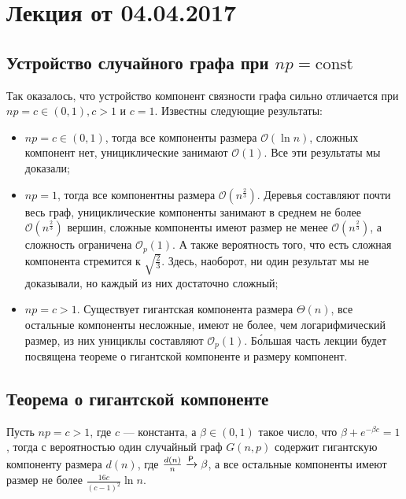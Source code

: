 \section{Лекция от 04.04.2017}

\subsection{Устройство случайного графа при $np = \mathrm{const}$}

Так оказалось, что устройство компонент связности
графа сильно отличается при 
$np = c \in (0, 1), c > 1$ и $c = 1$. Известны следующие результаты:

\begin{itemize}
  \item $np = c \in (0, 1)$, тогда все компоненты размера 
  $\mathcal{O}(\ln n)$, сложных компонент нет, 
  унициклические занимают $\mathcal{O}(1)$. Все эти результаты мы
  доказали;

  \item $np = 1$, тогда все компонентны размера $\mathcal{O}(n^{\frac23})$.
  Деревья составляют почти весь граф, унициклические компоненты занимают в 
  среднем не более $\mathcal{O}(n^{\frac23})$ вершин, сложные компоненты имеют
  размер не менее $\mathcal{O}(n^{\frac23})$, а сложность ограничена 
  $\mathcal{O}_p(1)$. А также вероятность того, что есть сложная компонента 
  стремится к $\sqrt{\frac23}$. Здесь, наоборот, ни один результат мы не 
  доказывали, но каждый из них достаточно сложный;

  \item $np = c > 1$. Существует гигантская компонента размера $\Theta(n)$, все
  остальные компоненты несложные, имеют не более, чем логарифмический размер, 
  из них унициклы составляют $\mathcal{O}_p(1)$.
  Б\'{о}льшая часть лекции будет посвящена теореме о гигантской компоненте и 
  размеру компонент.
\end{itemize}

\subsection{Теорема о гигантской компоненте}

\begin{theorem}
  Пусть $np = c > 1$, где $c$ --- константа, а $\beta \in (0, 1)$ такое число, 
  что $\beta + e^{-\beta c} = 1$, тогда с вероятностью один случайный граф 
  $G(n, p)$ содержит гигантскую компоненту размера $d(n)$, где $\frac{d(n)}{n} 
  \prto \beta$, а все остальные компоненты имеют размер не более 
  $\frac{16 c}{(c - 1)^2}\ln n$.
\end{theorem}

